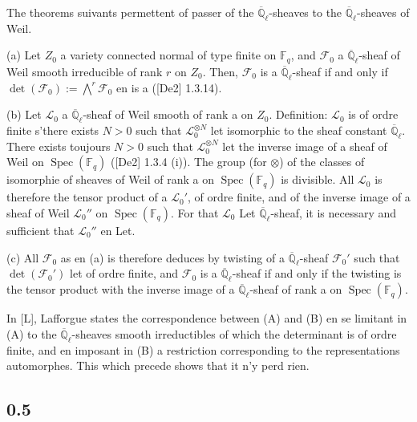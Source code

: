 \documentclass[11pt,a4paper]{article}
\theoremstyle{plain}
\theoremstyle{definition}
\DeclareMathOperator{\Spec}{Spec}
\begin{document}
The theorems suivants permettent of passer of the $\overline{\mathbb{Q}}_\ell$-sheaves to the $\overline{\mathbb{Q}}_\ell$-sheaves of Weil.

(a) Let $Z_0$ a variety connected normal of type finite on $\mathbb{F}_q$, and $\mathcal{F}_0$ a $\overline{\mathbb{Q}}_\ell$-sheaf of Weil smooth irreducible of rank $r$ on $Z_0$. Then, $\mathcal{F}_0$ is a $\overline{\mathbb{Q}}_\ell$-sheaf if and only if $\det(\mathcal{F}_0) := \bigwedge^r \mathcal{F}_0$ en is a ([De2] 1.3.14).

(b) Let $\mathcal{L}_0$ a $\overline{\mathbb{Q}}_\ell$-sheaf of Weil smooth of rank a on $Z_0$. Definition: $\mathcal{L}_0$ is of ordre finite s'there exists $N > 0$ such that $\mathcal{L}_0^{\otimes N}$ let isomorphic to the sheaf constant $\overline{\mathbb{Q}}_\ell$. There exists toujours $N > 0$ such that $\mathcal{L}_0^{\otimes N}$ let the inverse image of a sheaf of Weil on $\Spec(\mathbb{F}_q)$ ([De2] 1.3.4 (i)). The group (for $\otimes$) of the classes of isomorphie of sheaves of Weil of rank a on $\Spec(\mathbb{F}_q)$ is divisible. All $\mathcal{L}_0$ is therefore the tensor product of a $\mathcal{L}_0'$, of ordre finite, and of the inverse image of a sheaf of Weil $\mathcal{L}_0''$ on $\Spec(\mathbb{F}_q)$. For that $\mathcal{L}_0$ Let $\overline{\mathbb{Q}}_\ell$-sheaf, it is necessary and sufficient that $\mathcal{L}_0''$ en Let.

(c) All $\mathcal{F}_0$ as en (a) is therefore deduces by twisting of a $\overline{\mathbb{Q}}_\ell$-sheaf $\mathcal{F}_0'$ such that $\det(\mathcal{F}_0')$ let of ordre finite, and $\mathcal{F}_0$ is a $\overline{\mathbb{Q}}_\ell$-sheaf if and only if the twisting is the tensor product with the inverse image of a $\overline{\mathbb{Q}}_\ell$-sheaf of rank a on $\Spec(\mathbb{F}_q)$.

In [L], Lafforgue states the correspondence between (A) and (B) en se limitant in (A) to the $\overline{\mathbb{Q}}_\ell$-sheaves smooth irreductibles of which the determinant is of ordre finite, and en imposant in (B) a restriction corresponding to the representations automorphes. This which precede shows that it n'y perd rien.

\subsection*{0.5}
\end{document}

